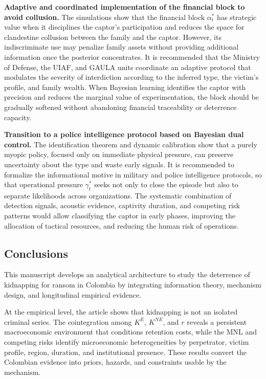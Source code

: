 \documentclass[ecta,nameyear,draft]{econsocart}
\theoremstyle{plain}
\theoremstyle{definition}
\newcommand{\1}{\mathbf{1}}
\begin{document}
\textbf{Adaptive and coordinated implementation of the financial block to avoid collusion.}\quad
The simulations show that the financial block $\alpha_t^\ast$ has strategic value when it disciplines the captor's participation and reduces the space for clandestine collusion between the family and the captor. However, its indiscriminate use may penalize family assets without providing additional information once the posterior concentrates. It is recommended that the Ministry of Defense, the UIAF, and GAULA units coordinate an adaptive protocol that modulates the severity of interdiction according to the inferred type, the victim's profile, and family wealth. When Bayesian learning identifies the captor with precision and reduces the marginal value of experimentation, the block should be gradually softened without abandoning financial traceability or deterrence capacity.

\textbf{Transition to a police intelligence protocol based on Bayesian dual control.}\quad
The identification theorem and dynamic calibration show that a purely myopic policy, focused only on immediate physical pressure, can preserve uncertainty about the type and waste early signals. It is recommended to formalize the informational motive in military and police intelligence protocols, so that operational pressure $\gamma_t^\ast$ seeks not only to close the episode but also to separate likelihoods across organizations. The systematic combination of detection signals, acoustic evidence, captivity duration, and competing risk patterns would allow classifying the captor in early phases, improving the allocation of tactical resources, and reducing the human risk of operations.

\subsection{Conclusions}

This manuscript develops an analytical architecture to study the deterrence of kidnapping for ransom in Colombia by integrating information theory, mechanism design, and longitudinal empirical evidence.

At the empirical level, the article shows that kidnapping is not an isolated criminal series. The cointegration among $K^E$, $K^{NE}$, and $r$ reveals a persistent macroeconomic environment that conditions retention costs, while the MNL and competing risks identify microeconomic heterogeneities by perpetrator, victim profile, region, duration, and institutional presence. These results convert the Colombian evidence into priors, hazards, and constraints usable by the mechanism.
\end{document}
